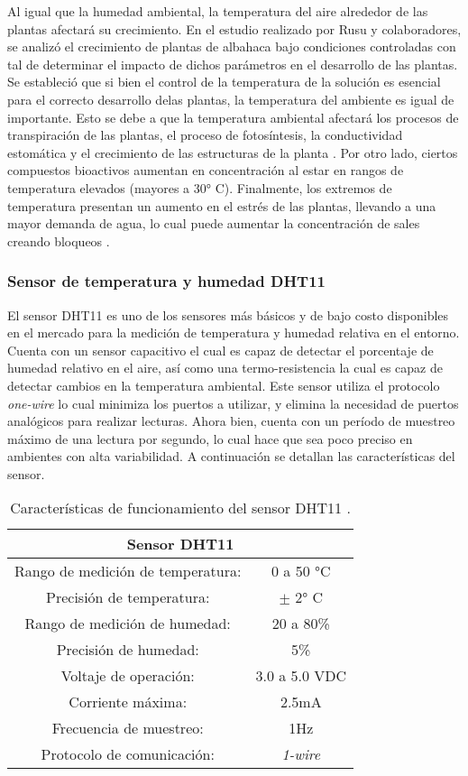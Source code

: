 Al igual que la humedad ambiental, la temperatura del aire alrededor de las plantas afectará su crecimiento. En el estudio realizado por Rusu y colaboradores, se analizó el crecimiento de plantas de albahaca bajo condiciones controladas con tal de determinar el impacto de dichos parámetros en el desarrollo de las plantas. Se estableció que si bien el control de la temperatura de la solución es esencial para el correcto desarrollo delas plantas, la temperatura del ambiente es igual de importante. Esto se debe a que la temperatura ambiental afectará los procesos de transpiración de las plantas, el proceso de fotosíntesis, la conductividad estomática y el crecimiento de las estructuras de la planta \cite{rusu_overview_2021}. Por otro lado, ciertos compuestos bioactivos aumentan en concentración al estar en rangos de temperatura elevados (mayores a 30° C). Finalmente, los extremos de temperatura presentan un aumento en el estrés de las plantas, llevando a una mayor demanda de agua, lo cual puede aumentar la concentración de sales creando bloqueos \cite{bita_plant_2013}. 

\subsubsection*{Sensor de temperatura y humedad DHT11}
El sensor DHT11 es uno de los sensores más básicos y de bajo costo disponibles en el mercado para la medición de temperatura y humedad relativa en el entorno. Cuenta con un sensor capacitivo el cual es capaz de detectar el porcentaje de humedad relativo en el aire, así como una termo-resistencia la cual es capaz de detectar cambios en la temperatura ambiental. \cite{adafruit_dht11} Este sensor utiliza el protocolo \textit{one-wire} lo cual minimiza los puertos a utilizar, y elimina la necesidad de puertos analógicos para realizar lecturas. Ahora bien, cuenta con un período de muestreo máximo de una lectura por segundo, lo cual hace que sea poco preciso en ambientes con alta variabilidad. A continuación se detallan las características del sensor.

\begin{table}[H]
	\centering
	\begin{tabular}{|c|c|}
		\hline
		\multicolumn{2}{|c|}{\textbf{Sensor DHT11}}\\ \hline
		Rango de medición de temperatura: & 0 a 50 °C \\ \hline
		Precisión de temperatura: & $\pm$ 2° C \\ \hline
		Rango de medición de humedad: & 20 a 80\% \\ \hline
		Precisión de humedad: & 5\% \\ \hline
		Voltaje de operación: & 3.0 a 5.0 VDC \\ \hline
		Corriente máxima: & 2.5mA \\ \hline
		Frecuencia de muestreo: & 1Hz \\ \hline
		Protocolo de comunicación: & \textit{1-wire} \\ \hline
	\end{tabular}
	\caption{Características de funcionamiento del sensor DHT11 \cite{adafruit_dht11}.}
	\label{Cuadro5}
\end{table}

